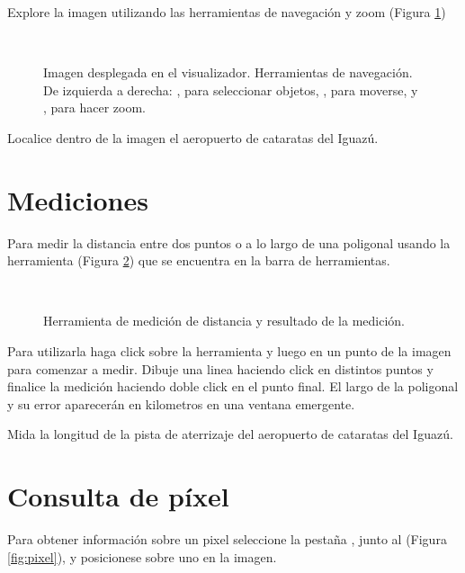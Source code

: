 Explore la imagen utilizando las herramientas de navegación y zoom (Figura \ref{fig:mono})

\begin{figure}[h!]
    \centering
    \\
    \caption{Imagen desplegada en el visualizador. Herramientas de navegación. De izquierda a derecha: , para seleccionar objetos, , para moverse, y , para hacer zoom.}
    \label{fig:mono}
\end{figure}

Localice dentro de la imagen el aeropuerto de cataratas del Iguazú.

\section{Mediciones}

Para medir la distancia entre dos puntos o a lo largo de una poligonal usando la herramienta  (Figura \ref{fig:distancia}) que se encuentra en la barra de herramientas.

\begin{figure}[h!]
    \centering
    \\
    \caption{Herramienta de medición de distancia  y resultado de la medición.}
    \label{fig:distancia}
\end{figure}

Para utilizarla haga click sobre la herramienta y luego en un punto de la imagen para comenzar a medir. Dibuje una linea haciendo click en distintos puntos y finalice la medición haciendo doble click en el punto final. El largo de la poligonal y su error aparecerán en kilometros en una ventana emergente.

Mida la longitud de la pista de aterrizaje del aeropuerto de cataratas del Iguazú.

\section{Consulta de píxel}

Para obtener información sobre un pixel seleccione la pestaña , junto al  (Figura \ref{fig:pixel}), y posicionese  sobre uno en la imagen.

